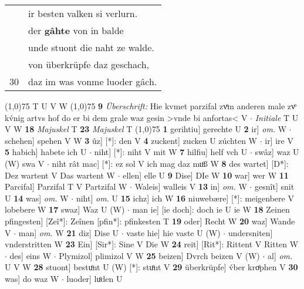 \documentclass[8pt,a4paper,notitlepage]{article}
\begin{document}
\begin{table}[ht]
\begin{minipage}[t]{0.5\linewidth}
\begin{tabular}{rl}
 & ir besten valken si verlurn.\\ 
 & der \textbf{gâhte} von in balde\\ 
 & unde stuont die naht ze walde.\\ 
 & von überkrüpfe daz geschach,\\ 
30 & daz im was vonme luoder gâch.\\ 
\end{tabular}
\scriptsize
\line(1,0){75} \newline
T U V W \newline
\line(1,0){75} \newline
\textbf{9} \textit{Überschrift:} Hie kvmet parzifal zvͦm anderen male zvͦ kv́nig artvs hof do er bi dem grale waz gesin >vnde bi anfortas< V   $\cdot$ \textit{Initiale} T U V W  \textbf{18} \textit{Majuskel} T  \textbf{23} \textit{Majuskel} T  \newline
\line(1,0){75} \newline
\textbf{1} gerihtiu] gerechte U \textbf{2} ir] \textit{om.} W  $\cdot$ schehen] spehen V W \textbf{3} ûz] [*]: den V \textbf{4} zuckent] zucken U zúchten W  $\cdot$ ir] ire V \textbf{5} habich] habete ich U  $\cdot$ niht] [*]: niht V mit W \textbf{7} hilfiu] helf vch U  $\cdot$ swâz] waz U (W) swa V  $\cdot$ niht rât mac] [*]: ez sol V ich mag daz muͦß W \textbf{8} des wartet] [D*]: Dez wartent V Das wartent W  $\cdot$ ellen] elle U \textbf{9} Dise] DIe W \textbf{10} war] wer W \textbf{11} Parcifal] Parzifal T V Partzifal W  $\cdot$ Waleis] walleis V \textbf{13} in] \textit{om.} W  $\cdot$ gesnît] snit U \textbf{14} was] \textit{om.} W  $\cdot$ niht] \textit{om.} U \textbf{15} ichz] ich W \textbf{16} niuwebære] [*]: meigenbere V lobebere W \textbf{17} swaz] Waz U (W)  $\cdot$ man ie] [ie doch]: doch ie U ie W \textbf{18} Zeinen pfingesten] [Zeî*]: Zeînen [pfin*]: pfinkesten T \textbf{19} oder] Recht W \textbf{20} waz] Wande V  $\cdot$ man] \textit{om.} W \textbf{21} diz] Dise U  $\cdot$ vaste hie] hie vaste U (W)  $\cdot$ undersniten] vnderstritten W \textbf{23} Ein] [Sir*]: Sine V Die W \textbf{24} reit] [Rit*]: Rittent V Ritten W  $\cdot$ des] eins W  $\cdot$ Plymizol] plimizol V W \textbf{25} beizen] Dvrch beizen V (W)  $\cdot$ al] \textit{om.} U V W \textbf{28} stuont] bestuͦnt U (W) [*]: stuͦnt  V \textbf{29} überkrüpfe] v́ber kroͤphen V \textbf{30} was] do waz W  $\cdot$ luoder] luͦden U \newline
\end{minipage}
\end{table}
\end{document}
